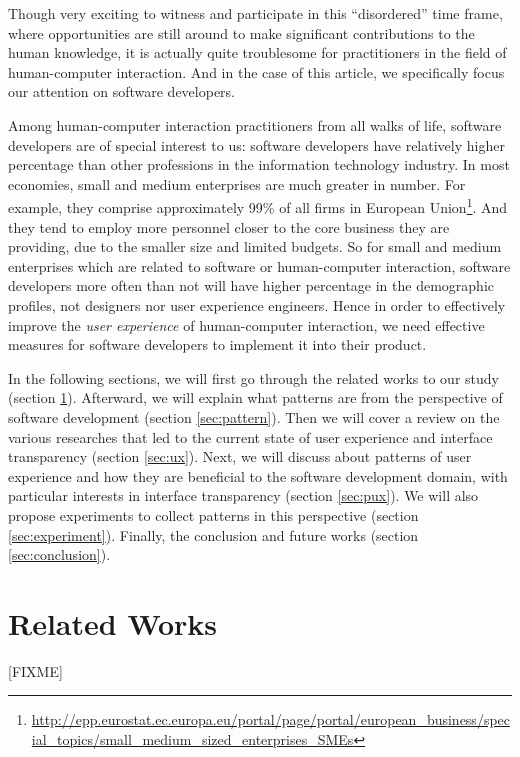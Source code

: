 \documentclass{acm_proc_article-sp}
\begin{document}
Though very exciting to witness and participate in this ``disordered''
time frame, where opportunities are still around to make significant
contributions to the human knowledge, it is actually quite troublesome
for practitioners in the field of human-computer interaction. And in
the case of this article, we specifically focus our attention on
software developers.

Among human-computer interaction practitioners from all walks of life,
software developers are of special interest to us: software developers
have relatively higher percentage than other professions in the
information technology industry. In most economies, small and medium
enterprises are much greater in number. For example, they comprise
approximately 99\% of all firms in European
Union\footnote{\url{http://epp.eurostat.ec.europa.eu/portal/page/portal/european_business/special_topics/small_medium_sized_enterprises_SMEs}}. And
they tend to employ more personnel closer to the core business they
are providing, due to the smaller size and limited budgets. So for
small and medium enterprises which are related to software or
human-computer interaction, software developers more often than not
will have higher percentage in the demographic profiles, not designers
nor user experience engineers. Hence in order to effectively improve
the \textit{user experience} of human-computer interaction, we need
effective measures for software developers to implement it into their
product.

In the following sections, we will first go through the related works
to our study (section \ref{sec:related}). Afterward, we will explain
what patterns are from the perspective of software development
(section \ref{sec:pattern}). Then we will cover a review on the
various researches that led to the current state of user experience
and interface transparency (section \ref{sec:ux}). Next, we will
discuss about patterns of user experience and how they are beneficial
to the software development domain, with particular interests in
interface transparency (section \ref{sec:pux}). We will also propose
experiments to collect patterns in this perspective (section
\ref{sec:experiment}). Finally, the conclusion and future works
(section \ref{sec:conclusion}).


\section{Related Works}
\label{sec:related}
[FIXME]
\end{document}
